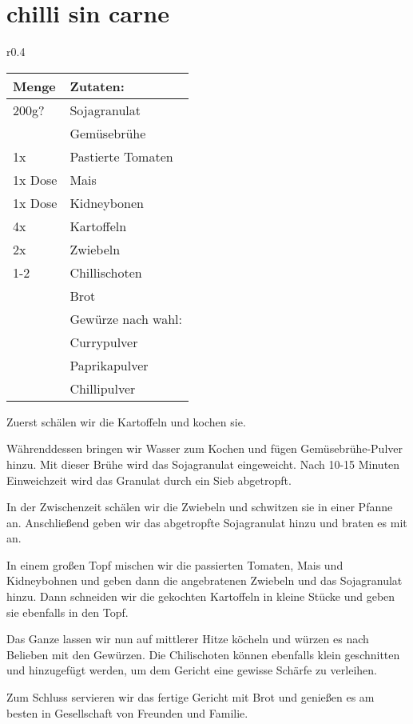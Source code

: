 \section{chilli sin carne}
\begin{wraptable}{r}{0.4\textwidth}
    \centering
    \begin{tabularx}{0.39\textwidth}{|l|X|}
        \hline
        Menge & Zutaten: \\
        \hline
        200g? & Sojagranulat \\
        \hline
        & Gemüsebrühe\\
        \hline
        1x & Pastierte Tomaten \\
        \hline
        1x Dose & Mais\\
        \hline
        1x Dose & Kidneybonen\\
        \hline
        4x & Kartoffeln\\
        \hline
        2x & Zwiebeln\\
        \hline
        1-2 & Chillischoten\\
        \hline
        & Brot\\
        \hline
        & Gewürze nach wahl:\\
        & Currypulver\\
        & Paprikapulver\\
        & Chillipulver\\
        \hline
    \end{tabularx}
\end{wraptable}

Zuerst schälen wir die Kartoffeln und kochen sie.

Währenddessen bringen wir Wasser zum Kochen und fügen Gemüsebrühe-Pulver hinzu. Mit dieser Brühe wird das Sojagranulat eingeweicht. Nach 10-15 Minuten Einweichzeit wird das Granulat durch ein Sieb abgetropft.

In der Zwischenzeit schälen wir die Zwiebeln und schwitzen sie in einer Pfanne an. Anschließend geben wir das abgetropfte Sojagranulat hinzu und braten es mit an.

In einem großen Topf mischen wir die passierten Tomaten, Mais und Kidneybohnen und geben dann die angebratenen Zwiebeln und das Sojagranulat hinzu. Dann schneiden wir die gekochten Kartoffeln in kleine Stücke und geben sie ebenfalls in den Topf.

Das Ganze lassen wir nun auf mittlerer Hitze köcheln und würzen es nach Belieben mit den Gewürzen. Die Chilischoten können ebenfalls klein geschnitten und hinzugefügt werden, um dem Gericht eine gewisse Schärfe zu verleihen.

Zum Schluss servieren wir das fertige Gericht mit Brot und genießen es am besten in Gesellschaft von Freunden und Familie.

\newpage